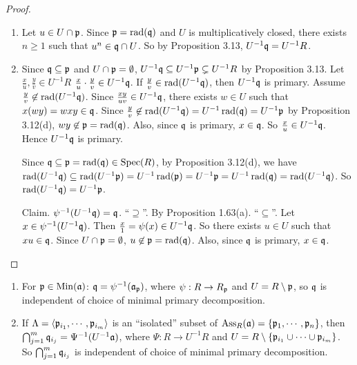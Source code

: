 \begin{proof}
    \begin{enumerate}
        \item Let $u \in U \cap \mathfrak{p}$. Since $\mathfrak{p} = \operatorname{rad}(\mathfrak{q})$ and $U$ is multiplicatively closed, there exists $n \geq 1$ such that $u^{n} \in \mathfrak{q} \cap U$. So by Proposition 3.13, $U^{-1}\mathfrak{q} = U^{-1}R$.
        \item Since $\mathfrak{q} \subseteq \mathfrak{p}$ and $U \cap \mathfrak{p} = \emptyset$, $U^{-1}\mathfrak{q} \subseteq U^{-1}\mathfrak{p} \subsetneq U^{-1}R$ by Proposition 3.13. Let $\frac{x}{u},\frac{y}{v} \in U^{-1}R$ $\frac{x}{u} \cdot \frac{y}{v} \in U^{-1}\mathfrak{q}$. If $\frac{y}{v} \in \operatorname{rad}(U^{-1}\mathfrak{q})$, then $U^{-1}\mathfrak{q}$ is primary. Assume $\frac{y}{v} \not \in \operatorname{rad}(U^{-1}\mathfrak{q})$. Since $\frac{xy}{uv} \in U^{-1}\mathfrak{q}$, there exists $w \in U$ such that $x(wy) = wxy \in \mathfrak{q}$. Since $\frac{y}{v} \not\in \operatorname{rad}(U^{-1}\mathfrak{q}) = U^{-1} \operatorname{rad}(\mathfrak{q}) = U^{-1}\mathfrak{p}$ by Proposition 3.12(d), $wy \not \in \mathfrak{p} = \operatorname{rad}(\mathfrak{q})$. Also, since $\mathfrak{q}$ is primary, $x \in \mathfrak{q}$. So $\frac{x}{u} \in U^{-1}\mathfrak{q}$. Hence $U^{-1}\mathfrak{q}$ is primary. \par 
            Since $\mathfrak{q} \subseteq \mathfrak{p} = \operatorname{rad}(\mathfrak{q}) \in \operatorname{Spec}(R)$, by Proposition 3.12(d), we have $\operatorname{rad}(U^{-1}\mathfrak{q}) \subseteq \operatorname{rad}(U^{-1}\mathfrak{p}) = U^{-1} \operatorname{rad}(\mathfrak{p}) = U^{-1}\mathfrak{p} = U^{-1} \operatorname{rad}(\mathfrak{q}) = \operatorname{rad}(U^{-1}\mathfrak{q})$. So $\operatorname{rad}(U^{-1}\mathfrak{q}) = U^{-1}\mathfrak{p}$. \par
            Claim. $\psi^{-1}(U^{-1}\mathfrak{q}) = \mathfrak{q}$. ``$\supseteq$''. By Proposition 1.63(a). ``$\subseteq$''. Let $x \in \psi^{-1}(U^{-1}\mathfrak{q})$. Then $\frac{x}{1} = \psi(x) \in U^{-1}\mathfrak{q}$. So there exists $u \in U$ such that $xu \in \mathfrak{q}$. Since $U \cap \mathfrak{p} = \emptyset$, $u \not \in \mathfrak{p} = \operatorname{rad}(\mathfrak{q})$. Also, since $\mathfrak{q}$ is primary, $x \in \mathfrak{q}$. \qedhere
    \end{enumerate}
\end{proof}

\begin{theorem}
    \begin{enumerate}
        \item For $\mathfrak{p} \in \operatorname{Min}(\mathfrak{a})$: $\mathfrak{q} = \psi^{-1}(\mathfrak{a}_{\mathfrak{p}})$, where $\psi: R \to R_{\mathfrak{p}}$ and $U = R \setminus \mathfrak{p}$, so $\mathfrak{q}$ is independent of choice of minimal primary decomposition.
        \item If $\Lambda = \langle \mathfrak{p}_{i_1},\cdots,\mathfrak{p}_{i_m} \rangle$ is an ``isolated'' subset of $\operatorname{Ass}_R(\mathfrak{a}) = \{\mathfrak{p}_1,\cdots,\mathfrak{p}_n\}$, then $\bigcap_{j=1}^{m} \mathfrak{q}_{i_j} = \Psi^{-1}(U^{-1}\mathfrak{a})$, where $\Psi: R \to U^{-1}R$ and $U = R \setminus \{\mathfrak{p}_{i_1} \cup \cdots \cup \mathfrak{p}_{i_m}\}$. So $\bigcap_{j=1}^{m}\mathfrak{q}_{i_j}$ is independent of choice of minimal primary decomposition.
    \end{enumerate}
\end{theorem}

